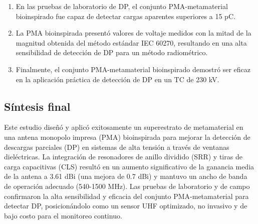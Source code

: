 \documentclass[11pt,a4paper]{article}
\begin{document}
\begin{enumerate}
    \item En las pruebas de laboratorio de DP, el conjunto PMA-metamaterial bioinspirado fue capaz de detectar cargas aparentes superiores a 15 pC.
    \item La PMA bioinspirada presentó valores de voltaje medidos con la mitad de la magnitud obtenida del método estándar IEC 60270, resultando en una alta sensibilidad de detección de DP para un método radiométrico.
    \item Finalmente, el conjunto PMA-metamaterial bioinspirado demostró ser eficaz en la aplicación práctica de detección de DP en un TC de 230 kV.
\end{enumerate}

\subsection*{Síntesis final}
Este estudio diseñó y aplicó exitosamente un superestrato de metamaterial en una antena monopolo impresa (PMA) bioinspirada para mejorar la detección de descargas parciales (DP) en sistemas de alta tensión a través de ventanas dieléctricas. La integración de resonadores de anillo dividido (SRR) y tiras de carga capacitivas (CLS) resultó en un aumento significativo de la ganancia media de la antena a 3.61 dBi (una mejora de 0.7 dBi) y mantuvo un ancho de banda de operación adecuado (540-1500 MHz). Las pruebas de laboratorio y de campo confirmaron la alta sensibilidad y eficacia del conjunto PMA-metamaterial para detectar DP, posicionándolo como un sensor UHF optimizado, no invasivo y de bajo costo para el monitoreo continuo.
\end{document}
